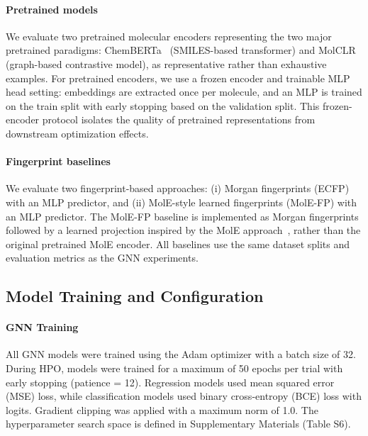 \documentclass[journal]{IEEEtran}
\begin{document}
\paragraph{Pretrained models}
We evaluate two pretrained molecular encoders representing the two major pretrained paradigms: ChemBERTa~\cite{chemberta2} (SMILES-based transformer) and MolCLR~\cite{molclr} (graph-based contrastive model), as representative rather than exhaustive examples. For pretrained encoders, we use a frozen encoder and trainable MLP head setting: embeddings are extracted once per molecule, and an MLP is trained on the train split with early stopping based on the validation split. This frozen-encoder protocol isolates the quality of pretrained representations from downstream optimization effects.

\paragraph{Fingerprint baselines}
We evaluate two fingerprint-based approaches: (i) Morgan fingerprints (ECFP)~\cite{rogers2010ecfp} with an MLP predictor, and (ii) MolE-style learned fingerprints (MolE-FP) with an MLP predictor. The MolE-FP baseline is implemented as Morgan fingerprints followed by a learned projection inspired by the MolE approach~\cite{molE}, rather than the original pretrained MolE encoder. All baselines use the same dataset splits and evaluation metrics as the GNN experiments.

\subsection{Model Training and Configuration}
\label{sec:model_training}

\paragraph{GNN Training}
All GNN models were trained using the Adam optimizer with a batch size of 32. During HPO, models were trained for a maximum of 50 epochs per trial with early stopping (patience = 12). Regression models used mean squared error (MSE) loss, while classification models used binary cross-entropy (BCE) loss with logits. Gradient clipping was applied with a maximum norm of 1.0. The hyperparameter search space is defined in Supplementary Materials (Table S6).
\end{document}
